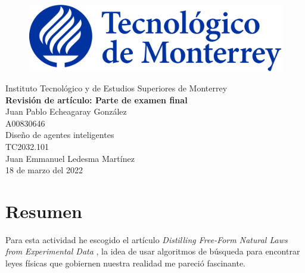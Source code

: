 \documentclass{article}
\begin{document}
    \begin{titlepage}
        \begin{center}
            \begin{figure}
                \centering
                \includegraphics[scale=0.13]{logo_itesm.png}\\ %
            \end{figure}
        \vspace{5cm}
        \LARGE{Instituto Tecnológico y de Estudios Superiores de Monterrey}\\
        \fontsize{12}{14}\selectfont
        \vspace{1cm}
        \textbf{Revisión de artículo: Parte de examen final}\\ %
        \vspace{0.7cm}
        Juan Pablo Echeagaray González\\ %
        \vspace{0.2cm}
        A00830646\\ %
        \vspace{0.7cm}
        Diseño de agentes inteligentes\\ %
        \vspace{0.2cm}
        TC2032.101\\ %
        \vspace{0.2cm}
        Juan Emmanuel Ledesma Martínez\\ %
        \vspace{0.7cm}
        18 de marzo del 2022\\ %
        \end{center}
    \end{titlepage}

    \section*{Resumen}
        Para esta actividad he escogido el artículo \emph{Distilling Free-Form Natural Laws from Experimental Data} \parencite{schmidt2009distilling}, la idea de usar algoritmos de búsqueda para encontrar leyes físicas que gobiernen nuestra realidad me pareció fascinante.
\end{document}
